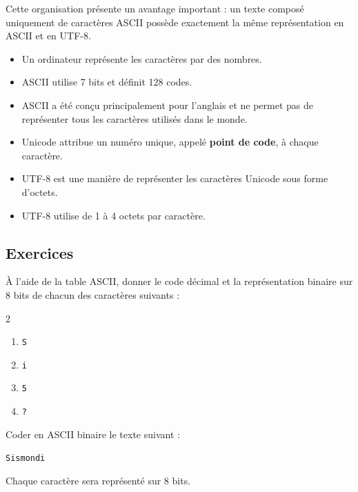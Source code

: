 \documentclass[11pt, a4paper]{book}
\begin{document}
Cette organisation présente un avantage important : un texte composé uniquement
de caractères ASCII possède exactement la même représentation en ASCII et en
UTF-8.


\begin{aretenir}
\begin{itemize}
\renewcommand{\labelitemi}{$\blacktriangleright$}

    \item Un ordinateur représente les caractères par des nombres.

    \item ASCII utilise 7 bits et définit 128 codes.

    \item ASCII a été conçu principalement pour l'anglais et ne permet pas de
    représenter tous les caractères utilisés dans le monde.

    \item Unicode attribue un numéro unique, appelé \textbf{point de code}, à
    chaque caractère.

    \item UTF-8 est une manière de représenter les caractères Unicode sous forme
    d'octets.

    \item UTF-8 utilise de 1 à 4 octets par caractère.

\end{itemize}
\end{aretenir}

\subsection{Exercices}

\begin{exercice}
À l'aide de la table ASCII, donner le code décimal et la représentation binaire
sur 8 bits de chacun des caractères suivants :

\begin{multicols}{2}
\begin{enumerate}
    \item \texttt{S}
    \item \texttt{i}
    \item \texttt{5}
    \item \texttt{?}
\end{enumerate}
\end{multicols}
\end{exercice}


\begin{exercice}
Coder en ASCII binaire le texte suivant :

\begin{center}
\texttt{Sismondi}
\end{center}

Chaque caractère sera représenté sur 8 bits.
\end{exercice}
\end{document}
